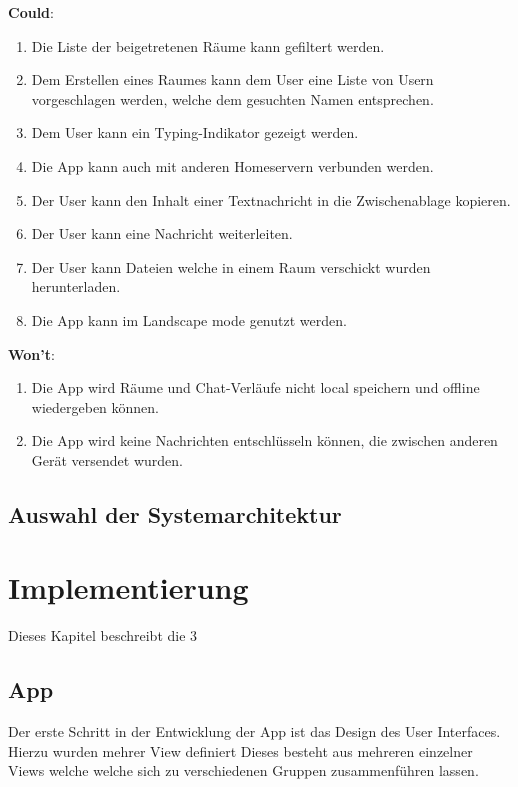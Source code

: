     \textbf{Could}:
    \begin{enumerate}[label={\roman*.}, leftmargin=2.5cm]
        \item Die Liste der beigetretenen Räume kann gefiltert werden.
        \item Dem Erstellen eines Raumes kann dem User eine Liste von Usern vorgeschlagen werden, welche dem gesuchten Namen entsprechen.
        \item Dem User kann ein Typing-Indikator gezeigt werden.
        \item Die App kann auch mit anderen Homeservern verbunden werden.
        \item Der User kann den Inhalt einer Textnachricht in die Zwischenablage kopieren.
        \item Der User kann eine Nachricht weiterleiten.
        \item Der User kann Dateien welche in einem Raum verschickt wurden herunterladen.
        \item Die App kann im Landscape mode genutzt werden.
    \end{enumerate}

    \textbf{Won't}:
    \begin{enumerate}[label={\roman*.}, leftmargin=2.5cm]
        \item Die App wird Räume und Chat-Verläufe nicht local speichern und offline wiedergeben können.
        \item Die App wird keine Nachrichten entschlüsseln können, die zwischen anderen Gerät versendet wurden.
    \end{enumerate}


    \section{Auswahl der Systemarchitektur}\label{sec:auswahl-der-systemarchitektur}

    \newpage
    \chapter{Implementierung}\label{ch:implementierung}
    Dieses Kapitel beschreibt die 3



    \section{App}
    Der erste Schritt in der Entwicklung der App ist das Design des User Interfaces.
    Hierzu wurden mehrer View definiert
    Dieses besteht aus mehreren einzelner Views welche welche sich zu verschiedenen Gruppen zusammenführen lassen.

